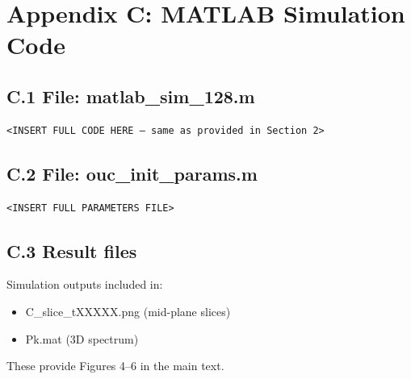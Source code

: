 \section*{Appendix C: MATLAB Simulation Code}

\subsection*{C.1 File: matlab\_sim\_128.m}

\begin{verbatim}
<INSERT FULL CODE HERE — same as provided in Section 2>
\end{verbatim}

\subsection*{C.2 File: ouc\_init\_params.m}

\begin{verbatim}
<INSERT FULL PARAMETERS FILE>
\end{verbatim}

\subsection*{C.3 Result files}

Simulation outputs included in:
\begin{itemize}
\item C\_slice\_tXXXXX.png (mid-plane slices)
\item Pk.mat (3D spectrum)
\end{itemize}

These provide Figures 4–6 in the main text.
